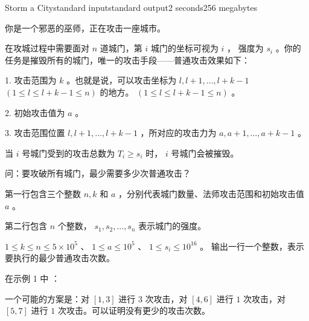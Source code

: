 \documentclass[12pt,a4paper,oneside]{article}
\begin{document}
    \begin{problem}{Storm a City}{standard input}{standard output}{2 seconds}{256 megabytes}
	
        你是一个邪恶的巫师，正在攻击一座城市。
    
        在攻城过程中需要面对 $n$ 道城门，第 $i$ 城门的坐标可视为 $i$ ， 强度为 $s_i $ 。你的任务是摧毁所有的城门，唯一的攻击手段——普通攻击效果如下：
        
        1. 攻击范围为 $k$ 。也就是说，可以攻击坐标为 $l, l + 1,... ,l + k - 1$ $(1 \le l \le l + k - 1 \le n)$ 的地方。 $(1 \le l \le l + k - 1 \le n)$ 。
        
        2. 初始攻击值为 $a$ 。
        
        3. 攻击范围位置 $l, l + 1,\dots ,l + k - 1$ ，所对应的攻击力为 $a, a + 1,\dots ,a + k - 1$ 。
        
        当 $i$ 号城门受到的攻击总数为 $T _i \ge s_i$ 时， $i$ 号城门会被摧毁。
        
        问：要攻破所有城门，最少需要多少次普通攻击？
        
	\InputFile

        第一行包含三个整数 $n, k$ 和 $a$ ，分别代表城门数量、法师攻击范围和初始攻击值 $a$ 。
        
        第二行包含 $n$ 个整数， $s_1, s_2,... , s_n$ 表示城门的强度。
        
        $1 \le k \le n \le 5\times 10^{5}$ 、 $1 \le a \le 10^{5}$ 、 $1 \le s_i \le 10^{16}$ 。
        \OutputFile
	输出一行一个整数，表示要执行的最少普通攻击次数。
	\Example
	
	\begin{example}
	\end{example}
	\Explanations
        在示例 1 中 ：

        一个可能的方案是：对 $[1, 3]$ 进行 $3$ 次攻击，对 $[4, 6]$ 进行 $1$ 次攻击，对 $[5, 7]$ 进行 $1$ 次攻击。可以证明没有更少的攻击次数。
	
\end{problem}

\end{document}
